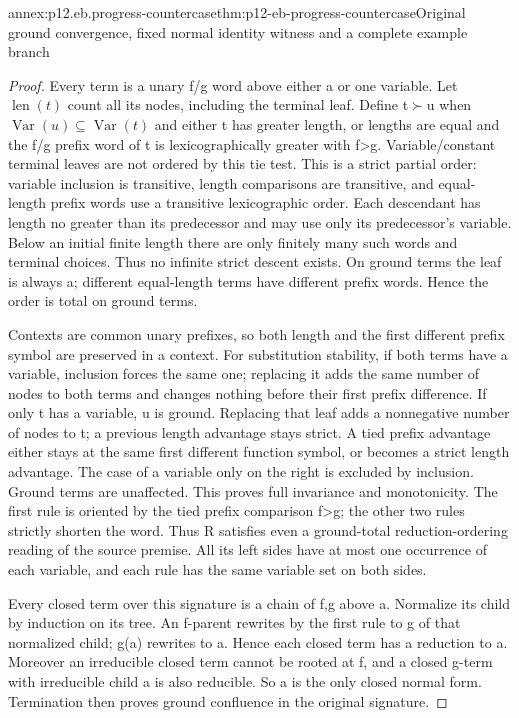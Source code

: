 \begin{annexitem}{annex:p12.eb.progress-countercase}{thm:p12-eb-progress-countercase}{Original ground convergence, fixed normal identity witness and a complete example branch}
\begin{proof}
Every term is a unary f/g word above either a or one variable.
Let \(\operatorname{len}(t)\) count all its nodes, including
the terminal leaf. Define t\(\succ\)u when
\(\operatorname{Var}(u)\subseteq\operatorname{Var}(t)\)
and either t has greater length, or lengths are equal and the
f/g prefix word of t is lexicographically greater with f>g.
Variable/constant terminal leaves are not ordered by this tie test.
This is a strict partial order: variable inclusion is transitive,
length comparisons are transitive, and equal-length prefix words
use a transitive lexicographic order. Each descendant has length
no greater than its predecessor and may use only its predecessor's
variable. Below an initial finite length there are only finitely
many such words and terminal choices. Thus no infinite strict
descent exists. On ground terms the leaf is always a; different
equal-length terms have different prefix words. Hence the order
is total on ground terms.

Contexts are common unary prefixes, so both length and the first
different prefix symbol are preserved in a context. For substitution
stability, if both terms have a variable, inclusion forces the same
one; replacing it adds the same number of nodes to both terms and
changes nothing before their first prefix difference. If only t
has a variable, u is ground. Replacing that leaf adds a nonnegative
number of nodes to t; a previous length advantage stays strict.
A tied prefix advantage either stays at the same first different
function symbol, or becomes a strict length advantage. The case
of a variable only on the right is excluded by inclusion. Ground
terms are unaffected. This proves full invariance and monotonicity.
The first rule is oriented by the tied prefix comparison f>g;
the other two rules strictly shorten the word. Thus R satisfies
even a ground-total reduction-ordering reading of the source premise.
All its left sides have at most one occurrence of each variable,
and each rule has the same variable set on both sides.

Every closed term over this signature is a chain of f,g above a.
Normalize its child by induction on its tree. An f-parent rewrites
by the first rule to g of that normalized child; g(a) rewrites
to a. Hence each closed term has a reduction to a. Moreover
an irreducible closed term cannot be rooted at f, and a closed
g-term with irreducible child a is also reducible. So a is the
only closed normal form. Termination then proves ground
confluence in the original signature.


\end{proof}
\end{annexitem}
